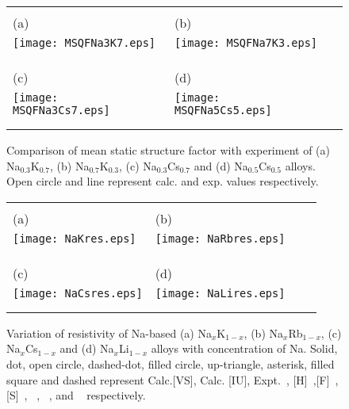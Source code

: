\documentclass[final12pt]{elsarticle}
\begin{document}
\begin{figure}[htp]
\begin{center}
\begin{tabular}{lll}
\vspace{-2.7cm}
 \\(a)& (b) \\
\texttt{[image: MSQFNa3K7.eps]}&
\texttt{[image: MSQFNa7K3.eps]}\\&\\&\\
\vspace{-3.0cm}
\\(c)&(d)\\
\texttt{[image: MSQFNa3Cs7.eps]}&
\texttt{[image: MSQFNa5Cs5.eps]}\\&\\&\\

\end{tabular}
\caption{Comparison of mean static structure factor with experiment of (a) Na$_{0.3}$K$_{0.7}$, (b) Na$_{0.7}$K$_{0.3}$, (c) Na$_{0.3}$Cs$_{0.7}$ and (d) Na$_{0.5}$Cs$_{0.5}$  alloys.  Open circle and line represent calc. and exp. values respectively.}
\label{pfig4}
\end{center}
\end{figure}


\begin{center}
\begin{figure}
\begin{tabular}{llll}
\vspace{-1.7cm}
\\(a)& (b) \\
\texttt{[image: NaKres.eps]}&
\texttt{[image: NaRbres.eps]}\\&\\&\\
\\(c)&(d)\\
\texttt{[image: NaCsres.eps]}&
\texttt{[image: NaLires.eps]}\\&\\&\\

\end{tabular}
\caption{Variation of resistivity of Na-based (a) Na$_{x}$K$_{1-x}$, (b) Na$_{x}$Rb$_{1-x}$, (c) Na$_{x}$Cs$_{1-x}$ and (d) Na$_{x}$Li$_{1-x}$ alloys with concentration of Na. Solid, dot, open circle, dashed-dot, filled circle, up-triangle, asterisk, filled square and dashed represent Calc.[VS], Calc. [IU], Expt.~\cite{Lugt1978,Hallers1974,feitsma1975}, [H]~\cite{Vora2007},[F]~\cite{Vora2007}, [S]~\cite{Vora2007}, ~\cite{Mishra1990}, ~\cite{Wang1980}, and ~\cite{Korkmaz2013} respectively.}
\label{pfig5}
\end{figure}
\end{center}
\end{document}
